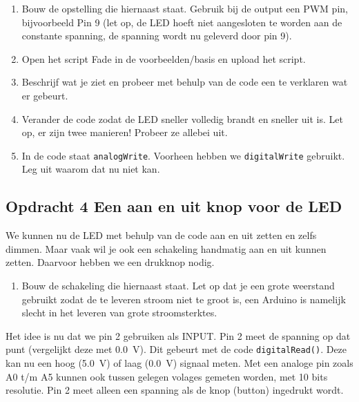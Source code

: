 \documentclass{arduino}
\begin{document}

\begin{enumerate}[label={\alph*})]
\item Bouw de opstelling die hiernaast staat.  Gebruik bij de output een PWM pin, bijvoorbeeld Pin 9 (let op, de LED hoeft niet aangesloten te worden aan de constante spanning, de spanning wordt nu geleverd door pin 9).

\item Open het script Fade in de voorbeelden/basis en upload het script.

\item Beschrijf wat je ziet en probeer met behulp van de code een te verklaren wat er gebeurt.

\item Verander de code zodat de LED sneller volledig brandt en sneller uit is. Let op, er zijn twee manieren! Probeer ze allebei uit.

\item In de code staat \lstinline{analogWrite}. Voorheen hebben we \lstinline{digitalWrite} gebruikt. Leg uit waarom dat nu niet kan.
\end{enumerate}

\subsection{Opdracht 4 Een aan en uit knop voor de LED}


We kunnen nu de LED met behulp van de code aan en uit zetten en zelfs dimmen. Maar vaak wil je ook een schakeling handmatig aan en uit kunnen zetten. Daarvoor hebben we een drukknop nodig.

\begin{enumerate}[label={\alph*})]
\item Bouw de schakeling die hiernaast staat. Let op dat je een grote weerstand gebruikt zodat de te leveren stroom niet te groot is, een Arduino is namelijk slecht in het leveren van grote stroomsterktes.
\end{enumerate}

Het idee is nu dat we pin 2 gebruiken als INPUT. Pin 2 meet de spanning op dat punt (vergelijkt deze met \SI{0.0}{\volt}). Dit gebeurt met de code \lstinline{digitalRead()}. Deze kan nu een hoog (\SI{5.0}{\volt}) of laag (\SI{0.0}{\volt}) signaal meten. Met een analoge pin zoals A0 t/m A5 kunnen ook tussen gelegen volages gemeten worden, met 10 bits resolutie. Pin 2 meet alleen een spanning als de knop (button) ingedrukt wordt.
\end{document}

